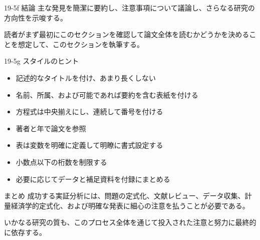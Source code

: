 \documentclass[
  ignorenonframetext,
]{beamer}
\providecommand{\tightlist}{%
  \setlength{\itemsep}{0pt}\setlength{\parskip}{0pt}}
\begin{document}
\begin{frame}{19-5f 結論}
\label{f-ux7d50ux8ad6}
主な発見を簡潔に要約し、注意事項について議論し、さらなる研究の方向性を示唆する。

読者がまず最初にこのセクションを確認して論文全体を読むかどうかを決めることを想定して、このセクションを執筆する。
\end{frame}

\begin{frame}{19-5g スタイルのヒント}
\label{g-ux30b9ux30bfux30a4ux30ebux306eux30d2ux30f3ux30c8}
\begin{itemize}
\tightlist
\item
  記述的なタイトルを付け、あまり長くしない
\item
  名前、所属、および可能であれば要約を含む表紙を付ける
\item
  方程式は中央揃えにし、連続して番号を付ける
\item
  著者と年で論文を参照
\item
  表は変数を明確に定義して明瞭に書式設定する
\item
  小数点以下の桁数を制限する
\item
  必要に応じてデータと補足資料を付録にまとめる
\end{itemize}
\end{frame}

\begin{frame}{まとめ}
\label{ux307eux3068ux3081}
成功する実証分析には、問題の定式化、文献レビュー、データ収集、計量経済学的定式化、および明確な発表に細心の注意を払うことが必要である。

いかなる研究の質も、このプロセス全体を通じて投入された注意と努力に最終的に依存する。
\end{frame}
\end{document}
